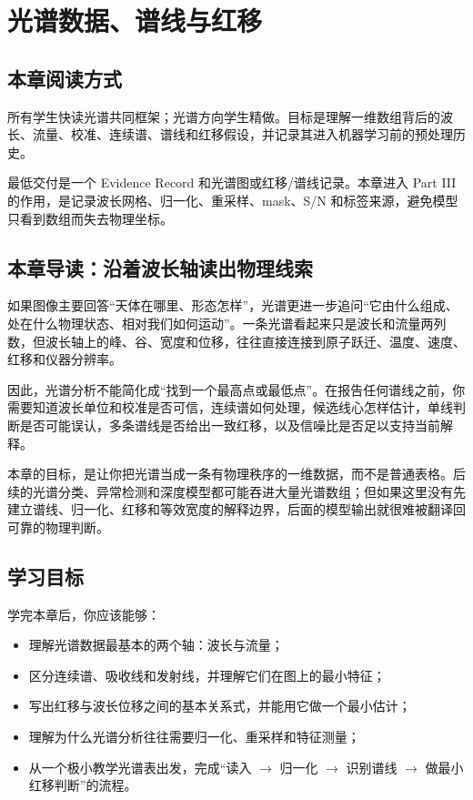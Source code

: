 \chapter{光谱数据、谱线与红移}

\section{本章阅读方式}

所有学生快读光谱共同框架；光谱方向学生精做。目标是理解一维数组背后的波长、流量、校准、连续谱、谱线和红移假设，并记录其进入机器学习前的预处理历史。

最低交付是一个 Evidence Record 和光谱图或红移/谱线记录。本章进入 Part III 的作用，是记录波长网格、归一化、重采样、mask、S/N 和标签来源，避免模型只看到数组而失去物理坐标。

\section{本章导读：沿着波长轴读出物理线索}

如果图像主要回答“天体在哪里、形态怎样”，光谱更进一步追问“它由什么组成、处在什么物理状态、相对我们如何运动”。一条光谱看起来只是波长和流量两列数，但波长轴上的峰、谷、宽度和位移，往往直接连接到原子跃迁、温度、速度、红移和仪器分辨率。

因此，光谱分析不能简化成“找到一个最高点或最低点”。在报告任何谱线之前，你需要知道波长单位和校准是否可信，连续谱如何处理，候选线心怎样估计，单线判断是否可能误认，多条谱线是否给出一致红移，以及信噪比是否足以支持当前解释。

本章的目标，是让你把光谱当成一条有物理秩序的一维数据，而不是普通表格。后续的光谱分类、异常检测和深度模型都可能吞进大量光谱数组；但如果这里没有先建立谱线、归一化、红移和等效宽度的解释边界，后面的模型输出就很难被翻译回可靠的物理判断。

\section{学习目标}

学完本章后，你应该能够：

\begin{itemize}
    \item 理解光谱数据最基本的两个轴：波长与流量；
    \item 区分连续谱、吸收线和发射线，并理解它们在图上的最小特征；
    \item 写出红移与波长位移之间的基本关系式，并能用它做一个最小估计；
    \item 理解为什么光谱分析往往需要归一化、重采样和特征测量；
    \item 从一个极小教学光谱表出发，完成“读入 $\rightarrow$ 归一化 $\rightarrow$ 识别谱线 $\rightarrow$ 做最小红移判断”的流程。
\end{itemize}

